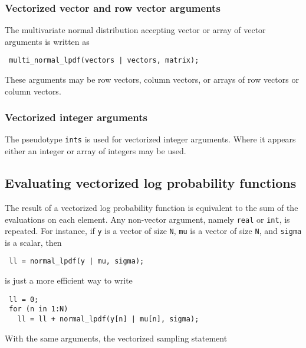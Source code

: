 \documentclass[
  10pt,
]{book}
\begin{document}
\hypertarget{vectorized-vector-and-row-vector-arguments}{%
\subsubsection{Vectorized vector and row vector arguments}\label{vectorized-vector-and-row-vector-arguments}}

The multivariate normal distribution accepting vector or array of
vector arguments is written as

\begin{verbatim}
 multi_normal_lpdf(vectors | vectors, matrix);
\end{verbatim}

These arguments may be row vectors, column vectors, or arrays of row
vectors or column vectors.

\hypertarget{vectorized-integer-arguments}{%
\subsubsection{Vectorized integer arguments}\label{vectorized-integer-arguments}}

The pseudotype \texttt{ints} is used for vectorized integer arguments. Where
it appears either an integer or array of integers may be used.

\hypertarget{evaluating-vectorized-log-probability-functions}{%
\subsection{Evaluating vectorized log probability functions}\label{evaluating-vectorized-log-probability-functions}}

The result of a vectorized log probability function is equivalent to
the sum of the evaluations on each element. Any non-vector argument,
namely \texttt{real} or \texttt{int}, is repeated. For instance, if \texttt{y} is a vector
of size \texttt{N}, \texttt{mu} is a vector of size \texttt{N}, and \texttt{sigma} is a scalar,
then

\begin{verbatim}
 ll = normal_lpdf(y | mu, sigma);
\end{verbatim}

is just a more efficient way to write

\begin{verbatim}
 ll = 0;
 for (n in 1:N)
   ll = ll + normal_lpdf(y[n] | mu[n], sigma);
\end{verbatim}

With the same arguments, the vectorized sampling statement
\end{document}
